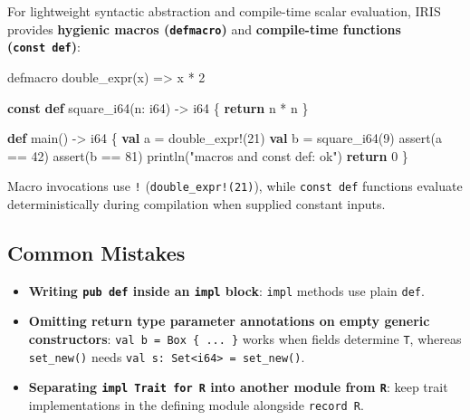 \documentclass[
  english,
  oneside]{book}
\newenvironment{Shaded}{\begin{snugshade}}{\end{snugshade}}
\newcommand{\ControlFlowTok}[1]{\textcolor[rgb]{0.77,0.53,0.75}{\textbf{#1}}}
\newcommand{\DataTypeTok}[1]{\textcolor[rgb]{0.31,0.79,0.69}{#1}}
\newcommand{\DecValTok}[1]{\textcolor[rgb]{0.71,0.81,0.66}{#1}}
\newcommand{\FunctionTok}[1]{\textcolor[rgb]{0.86,0.86,0.67}{#1}}
\newcommand{\KeywordTok}[1]{\textcolor[rgb]{0.34,0.61,0.84}{\textbf{#1}}}
\newcommand{\NormalTok}[1]{\textcolor[rgb]{0.83,0.83,0.83}{#1}}
\newcommand{\OperatorTok}[1]{\textcolor[rgb]{0.83,0.83,0.83}{#1}}
\newcommand{\StringTok}[1]{\textcolor[rgb]{0.81,0.57,0.47}{#1}}
\providecommand{\tightlist}{%
  \setlength{\itemsep}{0pt}\setlength{\parskip}{0pt}}
\begin{document}
For lightweight syntactic abstraction and compile-time scalar
evaluation, IRIS provides \textbf{hygienic macros (\texttt{defmacro})}
and \textbf{compile-time functions (\texttt{const\ def})}:

\begin{Shaded}
\begin{Highlighting}[]
\NormalTok{defmacro double\_expr(x) }\OperatorTok{=\textgreater{}}\NormalTok{ x }\OperatorTok{*} \DecValTok{2}

\KeywordTok{const} \KeywordTok{def}\NormalTok{ square\_i64(n: }\DataTypeTok{i64}\NormalTok{) }\OperatorTok{{-}\textgreater{}} \DataTypeTok{i64}\NormalTok{ \{}
    \ControlFlowTok{return}\NormalTok{ n }\OperatorTok{*}\NormalTok{ n}
\NormalTok{\}}

\KeywordTok{def}\NormalTok{ main() }\OperatorTok{{-}\textgreater{}} \DataTypeTok{i64}\NormalTok{ \{}
    \KeywordTok{val}\NormalTok{ a }\OperatorTok{=}\NormalTok{ double\_expr}\OperatorTok{!}\NormalTok{(}\DecValTok{21}\NormalTok{)}
    \KeywordTok{val}\NormalTok{ b }\OperatorTok{=}\NormalTok{ square\_i64(}\DecValTok{9}\NormalTok{)}
    \FunctionTok{assert}\NormalTok{(a }\OperatorTok{==} \DecValTok{42}\NormalTok{)}
    \FunctionTok{assert}\NormalTok{(b }\OperatorTok{==} \DecValTok{81}\NormalTok{)}
\NormalTok{    println(}\StringTok{"macros and const def: ok"}\NormalTok{)}
    \ControlFlowTok{return} \DecValTok{0}
\NormalTok{\}}
\end{Highlighting}
\end{Shaded}

Macro invocations use \texttt{!} (\texttt{double\_expr!(21)}), while
\texttt{const\ def} functions evaluate deterministically during
compilation when supplied constant inputs.

\subsection{Common Mistakes}\label{common-mistakes-6}

\begin{itemize}
\tightlist
\item
  \textbf{Writing \texttt{pub\ def} inside an \texttt{impl} block}:
  \texttt{impl} methods use plain \texttt{def}.
\item
  \textbf{Omitting return type parameter annotations on empty generic
  constructors}: \texttt{val\ b\ =\ Box\ \{\ ...\ \}} works when fields
  determine \texttt{T}, whereas \texttt{set\_new()} needs
  \texttt{val\ s:\ Set\textless{}i64\textgreater{}\ =\ set\_new()}.
\item
  \textbf{Separating \texttt{impl\ Trait\ for\ R} into another module
  from \texttt{R}}: keep trait implementations in the defining module
  alongside \texttt{record\ R}.
\end{itemize}
\end{document}

